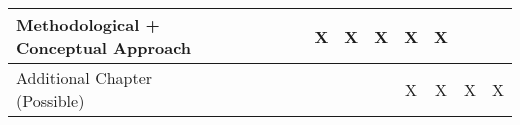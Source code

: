 \documentclass[a4paper,10pt]{article}
\begin{document}
\begin{table}[]
\begin{tabular}{|l|c|c|c|c|c|c|c|c|c|c|c|c|}
Methodological + Conceptual Approach &                          &                           &                           &                             &                                & X                              & X                               & X                               & X                            & X                             &                           &                           \\ \hline
Additional Chapter (Possible)        &                          &                           &                           &                             &                                &                              &                               &                               & X                              & X                             & X                          & X                          \\ \hline
\end{tabular}
\end{table}
\end{document}

